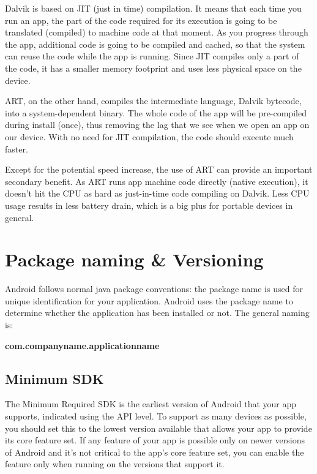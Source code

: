 Dalvik is based on JIT (just in time) compilation. It means that each time you run an app, the part of the code required for its execution is going to be translated (compiled) to machine code at that moment. As you progress through the app, additional code is going to be compiled and cached, so that the system can reuse the code while the app is running. Since JIT compiles only a part of the code, it has a smaller memory footprint and uses less physical space on the device.

ART, on the other hand, compiles the intermediate language, Dalvik bytecode, into a system-dependent binary. The whole code of the app will be pre-compiled during install (once), thus removing the lag that we see when we open an app on our device. With no need for JIT compilation, the code should execute much faster.

Except for the potential speed increase, the use of ART can provide an important secondary benefit. As ART runs app machine code directly (native execution), it doesn't hit the CPU as hard as just-in-time code compiling on Dalvik. Less CPU usage results in less battery drain, which is a big plus for portable devices in general.


\section{Package naming \& Versioning}
Android follows normal java package conventions: the package name is used for unique identification for your application. Android uses the package name to determine whether the application has been installed or not. The general naming is:

\begin{center}
	\textbf{com.companyname.applicationname}
\end{center}

\subsection{Minimum SDK}
The Minimum Required SDK is the earliest version of Android that your app supports, indicated using the API level. To support as many devices as possible, you should set this to the lowest version available that allows your app to provide its core feature set. If any feature of your app is possible only on newer versions of Android and it's not critical to the app's core feature set, you can enable the feature only when running on the versions that support it.

